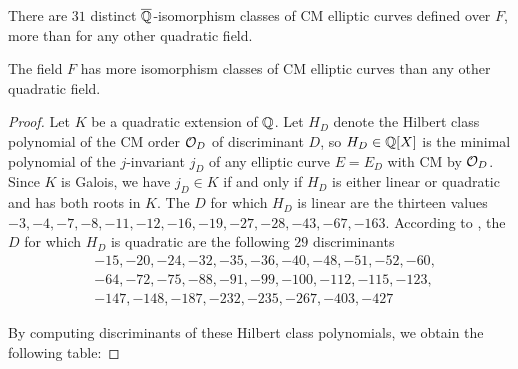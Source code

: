 \documentclass{amsart}
\begin{document}
There are $31$ distinct $\overline{\mathbb{Q}}$-isomorphism classes of CM elliptic
curves defined over $F$, more than for any other
quadratic field.

\begin{proposition}
The field $F$ has more isomorphism classes of CM
elliptic curves than any other quadratic field.
\end{proposition}
\begin{proof}
Let $K$ be a quadratic extension of $\mathbb{Q}$.
Let $H_D$ denote the Hilbert class polynomial of the CM order
$\mathcal{O}_D$ of discriminant $D$, so $H_D\in \mathbb{Q}[X]$ is the minimal
polynomial of the $j$-invariant $j_D$ of any elliptic curve $E=E_D$ with
CM by $\mathcal{O}_D$.   Since $K$ is Galois, we have $j_D \in K$ if and only if
$H_D$ is either linear or quadratic and has both roots in $K$.
The $D$ for which $H_D$ is linear are the thirteen values
$-3, -4, -7, -8, -11, -12, -16, -19, -27, -28, -43, -67, -163$.
According to \cite{cremona:abvar}, the
$D$ for which $H_D$ is quadratic are the following $29$
discriminants
\begin{align*}
&-15, -20, -24, -32, -35, -36, -40, -48, -51, -52, -60, \\
&-64, -72, -75, -88, -91, -99, -100, -112, -115, -123, \\
&-147, -148, -187, -232, -235, -267, -403, -427
\end{align*}
 
By computing discriminants of these Hilbert class polynomials,
we obtain the following table:



\end{proof}
\end{document}
